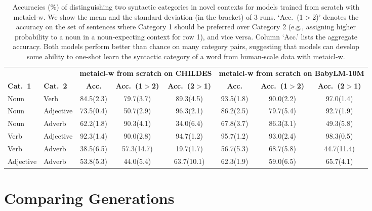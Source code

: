 \documentclass{article}
\begin{document}
\begin{table*}[t]
\small
\begin{center}
\begin{tabular}{ll|ccc|ccc}
\toprule
\multicolumn{2}{c|}{} & \multicolumn{3}{c|}{\bf \ac{metaicl-w} from scratch on CHILDES} & \multicolumn{3}{c}{\bf \ac{metaicl-w} from scratch on BabyLM-10M} \\
\bf Cat.\ 1 & \bf Cat.\ 2 & \bf Acc. & \bf Acc.\ (1$>$2) & \bf Acc.\ (2$>$1) & \bf Acc. & \bf Acc.\ (1$>$2) & \bf Acc.\ (2$>$1) \\
\midrule
Noun      & Verb      & 84.5(2.3) &     79.7(3.7) &     89.3(4.5) & 93.5(1.8) &     90.0(2.2) &     97.0(1.4) \\
Noun      & Adjective & 73.5(0.4) &     50.7(2.9) &     96.3(2.1) & 86.2(2.5) &     79.7(5.4) &     92.7(1.9) \\
Noun      & Adverb    & 62.2(1.8) &     90.3(4.1) &     34.0(6.4) & 67.8(3.7) &     86.3(3.1) &     49.3(5.8) \\
Verb      & Adjective & 92.3(1.4) &     90.0(2.8) &     94.7(1.2) & 95.7(1.2) &     93.0(2.4) &     98.3(0.5) \\
Verb      & Adverb    & 38.5(6.5) &     57.3(14.7)&     19.7(1.7) & 56.7(5.3) &     68.7(5.8) &     44.7(11.4)\\
Adjective & Adverb    & 53.8(5.3) &     44.0(5.4) &     63.7(10.1)& 62.3(1.9) &     59.0(6.5) &     65.7(4.1) \\
\bottomrule
\end{tabular}
\end{center}
\caption{Accuracies (\%) of distinguishing two syntactic categories in novel contexts for models trained from scratch with \ac{metaicl-w}.
We show the mean and the standard deviation (in the bracket) of 3 runs.
`Acc.\ (1$>$2)' denotes the accuracy on the set of sentences where Category 1 should be preferred over Category 2 (e.g., assigning higher probability to a noun in a noun-expecting context for row 1), and vice versa. Column `Acc.' lists the aggregate accuracy. Both models perform better than chance on many category pairs, suggesting that models can develop some ability to one-shot learn the syntactic category of a word from human-scale data with \ac{metaicl-w}.}
\label{tab:category-classification-scratch}
\end{table*}


\clearpage
\section{Comparing Generations}
\label{app:comparing-generations}
\end{document}
